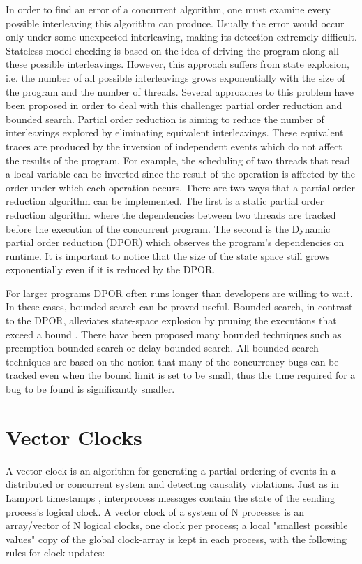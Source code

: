 In order to find an error of a concurrent algorithm, one must examine every possible interleaving this algorithm can produce. Usually the error 
would occur only under some unexpected interleaving, making its detection extremely difficult. Stateless model checking is based on the idea of driving 
the program along all these possible interleavings. However, this approach suffers from state explosion, i.e. the number of all possible interleavings grows 
exponentially with the size of the program and the number of threads. Several approaches to this problem have been proposed in order to deal with this challenge: 
partial order reduction and bounded search. Partial order reduction is aiming to reduce the number of interleavings explored by eliminating equivalent interleavings.
These equivalent traces are produced by the inversion of independent events which do not affect the results of the program. For example, the scheduling of two threads that read a local
variable can be inverted since the result of the operation is affected by the order under which each operation occurs. 
There are two ways that a partial order reduction algorithm can be implemented. The first is a
static partial order reduction algorithm where the dependencies between two threads are tracked before the execution of the concurrent program. 
The second is the Dynamic partial order reduction (DPOR) which observes the program's dependencies on runtime. It is important to notice that the size of
the state space still grows exponentially even if it is reduced by the DPOR. 

For larger programs DPOR often runs longer than developers are willing to wait. In these cases, bounded search can be proved useful. Bounded search,
in contrast to the DPOR, alleviates state-space explosion by pruning the executions that exceed a bound \cite{Thomson}. There have been proposed many bounded techniques
such as preemption bounded search or delay bounded search. All bounded search techniques are based on the notion that many of the concurrency bugs can be
tracked even when the bound limit is set to be small, thus the time required for a bug to be found is significantly smaller.

\section{Vector Clocks}

A vector clock is an algorithm for generating a partial ordering of events in a distributed or concurrent system and detecting causality violations. 
Just as in Lamport timestamps \cite{Lamp}, interprocess messages contain the state of the sending process's logical clock. 
A vector clock of a system of N processes is an array/vector of N logical clocks, one clock per process; 
a local "smallest possible values" copy of the global clock-array is kept in each process, with the following rules for clock updates:

